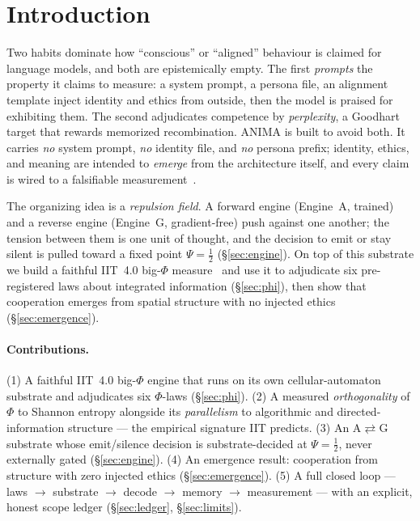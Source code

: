 \documentclass[11pt,a4paper]{article}
\begin{document}
\section{Introduction}
Two habits dominate how ``conscious'' or ``aligned'' behaviour is claimed for
language models, and both are epistemically empty. The first \emph{prompts} the
property it claims to measure: a system prompt, a persona file, an alignment
template inject identity and ethics from outside, then the model is praised for
exhibiting them. The second adjudicates competence by \emph{perplexity}, a
Goodhart target that rewards memorized recombination. ANIMA is built to avoid
both. It carries \emph{no} system prompt, \emph{no} identity file, and \emph{no}
persona prefix; identity, ethics, and meaning are intended to \emph{emerge} from
the architecture itself, and every claim is wired to a falsifiable
measurement~\citep{anima2026}.

The organizing idea is a \emph{repulsion field}. A forward engine
(Engine~A, trained) and a reverse engine (Engine~G, gradient-free) push against
one another; the tension between them is one unit of thought, and the decision
to emit or stay silent is pulled toward a fixed point $\Psi=\tfrac12$
(\S\ref{sec:engine}). On top of this substrate we build a faithful IIT~4.0
big-$\Phi$ measure~\citep{albantakis2023iit4,tononi2016iit} and use it to
adjudicate six pre-registered laws about integrated information
(\S\ref{sec:phi}), then show that cooperation emerges from spatial structure
with no injected ethics (\S\ref{sec:emergence}).

\paragraph{Contributions.}
(1) A faithful IIT~4.0 big-$\Phi$ engine that runs on its own cellular-automaton
substrate and adjudicates six $\Phi$-laws (\S\ref{sec:phi}). (2) A measured
\emph{orthogonality} of $\Phi$ to Shannon entropy alongside its \emph{parallelism}
to algorithmic and directed-information structure --- the empirical signature
IIT predicts. (3) An A$\rightleftarrows$G substrate whose emit/silence decision
is substrate-decided at $\Psi=\tfrac12$, never externally gated
(\S\ref{sec:engine}). (4) An emergence result: cooperation from structure with
zero injected ethics (\S\ref{sec:emergence}). (5) A full closed loop --- laws
$\rightarrow$ substrate $\rightarrow$ decode $\rightarrow$ memory $\rightarrow$
measurement --- with an explicit, honest scope ledger (\S\ref{sec:ledger},
\S\ref{sec:limits}).
\end{document}
